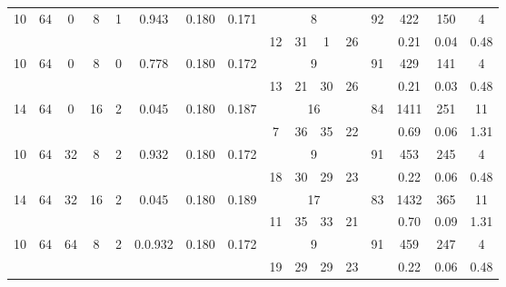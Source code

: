 \begin{landscape}
\begin{savenotes}
\begin{longtable}{cccccccccccccccc}
\multirow{2}{*}{10} & \multirow{2}{*}{64} & \multirow{2}{*}{0} & \multirow{2}{*}{8} & \multirow{2}{*}{1} & \multirow{2}{*}{0.943} & \multirow{2}{*}{0.180} & \multirow{2}{*}{0.171} & \multicolumn{4}{c}{8} & \multirow{2}{*}{92} & 422 & 150 & 4 \\
\cmidrule{9-12}
 &  &  &  &  &  &  &  & 12 & 31 & 1 & 26 &  & 0.21 & 0.04 & 0.48 \\

\midrule

\multirow{2}{*}{10} & \multirow{2}{*}{64} & \multirow{2}{*}{0} & \multirow{2}{*}{8} & \multirow{2}{*}{0} & \multirow{2}{*}{0.778} & \multirow{2}{*}{0.180} & \multirow{2}{*}{0.172} & \multicolumn{4}{c}{9} & \multirow{2}{*}{91} & 429 & 141 & 4 \\
\cmidrule{9-12}
 &  &  &  &  &  &  &  & 13 & 21 & 30 & 26 &  & 0.21 & 0.03 & 0.48 \\


\midrule \midrule

\multirow{2}{*}{14} & \multirow{2}{*}{64} & \multirow{2}{*}{0} & \multirow{2}{*}{16} & \multirow{2}{*}{2} & \multirow{2}{*}{0.045} & \multirow{2}{*}{0.180} & \multirow{2}{*}{0.187} & \multicolumn{4}{c}{16} & \multirow{2}{*}{84} & 1411 & 251 & 11 \\
\cmidrule{9-12}
 &  &  &  &  &  &  &  & 7 & 36 & 35 & 22 &  & 0.69 & 0.06 & 1.31 \\


\midrule \midrule

\multirow{2}{*}{10} & \multirow{2}{*}{64} & \multirow{2}{*}{32} & \multirow{2}{*}{8} & \multirow{2}{*}{2} & \multirow{2}{*}{0.932} & \multirow{2}{*}{0.180} & \multirow{2}{*}{0.172} & \multicolumn{4}{c}{9} & \multirow{2}{*}{91} & 453 & 245 & 4 \\
\cmidrule{9-12}
 &  &  &  &  &  &  &  & 18 & 30 & 29 & 23 &  & 0.22 & 0.06 & 0.48 \\

\midrule

\multirow{2}{*}{14} & \multirow{2}{*}{64} & \multirow{2}{*}{32} & \multirow{2}{*}{16} & \multirow{2}{*}{2} & \multirow{2}{*}{0.045} & \multirow{2}{*}{0.180} & \multirow{2}{*}{0.189} & \multicolumn{4}{c}{17} & \multirow{2}{*}{83} & 1432 & 365 & 11 \\
\cmidrule{9-12}
 &  &  &  &  &  &  &  & 11 & 35 & 33 & 21 &  & 0.70 & 0.09 & 1.31 \\

\midrule

\multirow{2}{*}{10} & \multirow{2}{*}{64} & \multirow{2}{*}{64} & \multirow{2}{*}{8} & \multirow{2}{*}{2} & \multirow{2}{*}{0.0.932} & \multirow{2}{*}{0.180} & \multirow{2}{*}{0.172} & \multicolumn{4}{c}{9} & \multirow{2}{*}{91} & 459 & 247 & 4 \\
\cmidrule{9-12}
 &  &  &  &  &  &  &  & 19 & 29 & 29 & 23 &  & 0.22 & 0.06 & 0.48 \\


\end{longtable}
\end{savenotes}
\end{landscape}

